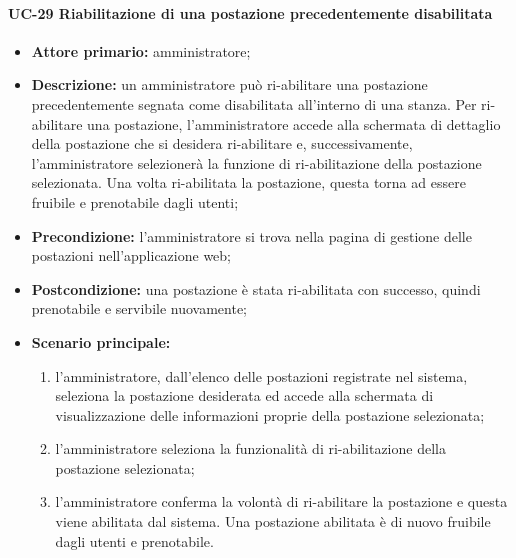 \paragraph{UC-29 Riabilitazione di una postazione precedentemente disabilitata}
\begin{itemize}
    \item \textbf{Attore primario:} amministratore;
    \item \textbf{Descrizione:} un amministratore pu\`{o} ri-abilitare una postazione precedentemente segnata come disabilitata all'interno di una stanza. Per ri-abilitare una postazione, l'amministratore accede alla schermata di dettaglio della postazione che si desidera ri-abilitare e, successivamente, l'amministratore selezionerà la funzione di ri-abilitazione della postazione selezionata. Una volta ri-abilitata la postazione, questa torna ad essere fruibile e prenotabile dagli utenti;
    \item \textbf{Precondizione:} l'amministratore si trova nella pagina di gestione delle postazioni nell'applicazione web;
    \item \textbf{Postcondizione:} una postazione \`{e} stata ri-abilitata con successo, quindi prenotabile e servibile nuovamente;
    \item \textbf{Scenario principale:}
    \begin{enumerate}
        \item l'amministratore, dall'elenco delle postazioni registrate nel sistema, seleziona la postazione desiderata ed accede alla schermata di visualizzazione delle informazioni proprie della postazione selezionata;
        \item l'amministratore seleziona la funzionalità di ri-abilitazione della postazione selezionata;
        \item l'amministratore conferma la volontà di ri-abilitare la postazione e questa viene abilitata dal sistema. Una postazione abilitata è di nuovo fruibile dagli utenti e prenotabile.
    \end{enumerate}
\end{itemize}
